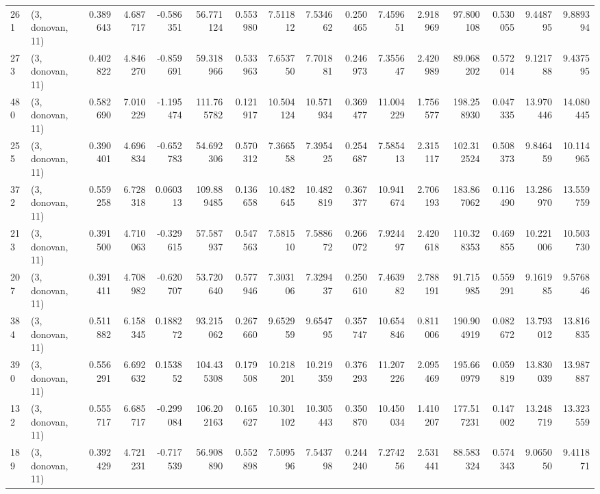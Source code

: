 \begin{tabular}{llrrrrrrrrrrrrrr}
261 &  (3, donovan, 11) &   0.389643 &   4.687717 &  -0.586351 &    56.771124 &   0.553980 &   7.511812 &   7.534662 &  0.250465 &   7.459651 &   2.918969 &    97.800108 &   0.530055 &   9.448795 &   9.889394 \\
273 &  (3, donovan, 11) &   0.402822 &   4.846270 &  -0.859691 &    59.318966 &   0.533963 &   7.653750 &   7.701881 &  0.246973 &   7.355647 &   2.420989 &    89.068202 &   0.572014 &   9.121788 &   9.437595 \\
480 &  (3, donovan, 11) &   0.582690 &   7.010229 &  -1.195474 &   111.765782 &   0.121917 &  10.504124 &  10.571934 &  0.369477 &  11.004229 &   1.756577 &   198.258930 &   0.047335 &  13.970446 &  14.080445 \\
255 &  (3, donovan, 11) &   0.390401 &   4.696834 &  -0.652783 &    54.692306 &   0.570312 &   7.366558 &   7.395425 &  0.254687 &   7.585413 &   2.315117 &   102.312524 &   0.508373 &   9.846459 &  10.114965 \\
372 &  (3, donovan, 11) &   0.559258 &   6.728318 &   0.060313 &   109.889485 &   0.136658 &  10.482645 &  10.482819 &  0.367377 &  10.941674 &   2.706193 &   183.867062 &   0.116490 &  13.286970 &  13.559759 \\
213 &  (3, donovan, 11) &   0.391500 &   4.710063 &  -0.329615 &    57.587937 &   0.547563 &   7.581510 &   7.588672 &  0.266072 &   7.924497 &   2.420618 &   110.328353 &   0.469855 &  10.221006 &  10.503730 \\
207 &  (3, donovan, 11) &   0.391411 &   4.708982 &  -0.620707 &    53.720640 &   0.577946 &   7.303106 &   7.329437 &  0.250610 &   7.463982 &   2.788191 &    91.715985 &   0.559291 &   9.161985 &   9.576846 \\
384 &  (3, donovan, 11) &   0.511882 &   6.158345 &   0.188272 &    93.215062 &   0.267660 &   9.652959 &   9.654795 &  0.357747 &  10.654846 &   0.811006 &   190.904919 &   0.082672 &  13.793012 &  13.816835 \\
390 &  (3, donovan, 11) &   0.556291 &   6.692632 &   0.153852 &   104.435308 &   0.179508 &  10.218201 &  10.219359 &  0.376293 &  11.207226 &   2.095469 &   195.660979 &   0.059819 &  13.830039 &  13.987887 \\
132 &  (3, donovan, 11) &   0.555717 &   6.685717 &  -0.299084 &   106.202163 &   0.165627 &  10.301102 &  10.305443 &  0.350870 &  10.450034 &   1.410207 &   177.517231 &   0.147002 &  13.248719 &  13.323559 \\
189 &  (3, donovan, 11) &   0.392429 &   4.721231 &  -0.717539 &    56.908890 &   0.552898 &   7.509596 &   7.543798 &  0.244240 &   7.274256 &   2.531441 &    88.583324 &   0.574343 &   9.065050 &   9.411871 \\

\end{tabular}
